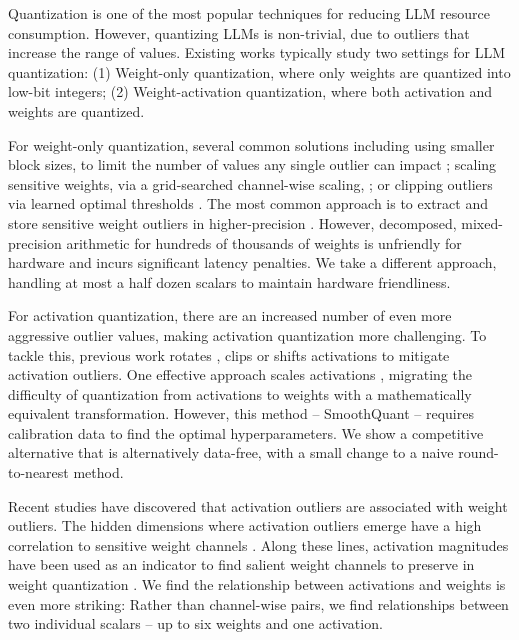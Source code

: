 \documentclass{article} %
\begin{document}
Quantization is one of the most popular techniques for reducing LLM resource consumption. However, quantizing LLMs is non-trivial, due to outliers that increase the range of values. Existing works typically study two settings for LLM quantization: (1) Weight-only quantization, where only weights are quantized into low-bit integers; (2) Weight-activation quantization, where both activation and weights are quantized. 

For weight-only quantization, several common solutions including using smaller block sizes, to limit the number of values any single outlier can impact \citep{dettmers2024spqr, shao2024omniquant, dettmers2023case, frantar-gptq, dettmers2023qlora}; scaling sensitive weights, via a grid-searched channel-wise scaling, \citet{lin2024awq}; or clipping outliers via learned optimal thresholds \citep{shao2024omniquant, lin2024awq}. The most common approach is to extract and store sensitive weight outliers in higher-precision \citep{dettmers2024spqr, kim2024squeezellm, NEURIPS2022_c3ba4962}. However, decomposed, mixed-precision arithmetic for hundreds of thousands of weights is unfriendly for hardware and incurs significant latency penalties. We take a different approach, handling at most a half dozen scalars to maintain hardware friendliness.

For activation quantization, there are an increased number of even more aggressive outlier values, making activation quantization more challenging. To tackle this, previous work rotates \citep{liu2024spinquant,ashkboos2024quarot,QuIP},
clips \citep{NEURIPS2022_6f6db140} or shifts \citep{wei-etal-2023-outlier, shao2024omniquant} activations to mitigate activation outliers. One effective approach scales activations \citep{10.5555/3618408.3619993}, migrating the difficulty of quantization from activations to weights with a mathematically equivalent transformation. However, this method -- SmoothQuant -- requires calibration data to find the optimal hyperparameters. We show a competitive alternative that is alternatively data-free, with a small change to a naive round-to-nearest method.

Recent studies have discovered that activation outliers are associated with weight outliers. The hidden dimensions where activation outliers emerge have a high correlation to sensitive weight channels \citep{heo2024rethinking, OWQ}. Along these lines, activation magnitudes have been used as an indicator to find salient weight channels to preserve in weight quantization \citep{lin2024awq}. We find the relationship between activations and weights is even more striking: Rather than channel-wise pairs, we find relationships between two individual scalars -- up to six weights and one activation.
\end{document}
